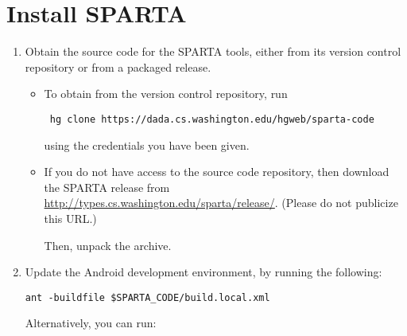 \section{Install SPARTA\label{sec:install}}

\begin{enumerate}

\item
  Obtain the source code for the SPARTA tools, either from its version
  control repository or from a packaged release.

\begin{itemize}
\item
  To obtain from the version control repository, run
\begin{Verbatim}
 hg clone https://dada.cs.washington.edu/hgweb/sparta-code
\end{Verbatim}
  using the credentials you have been given.
\item 
  If you do not have access to the source code repository, then
  download the SPARTA release from
  \url{http://types.cs.washington.edu/sparta/release/}.  (Please do not
  publicize this URL.)  

  Then, unpack the archive.
\end{itemize}

% 

\item Update the Android development environment, by 
running the following:

\begin{Verbatim}
ant -buildfile $SPARTA_CODE/build.local.xml
\end{Verbatim}

Alternatively, you can run:


\end{enumerate}
